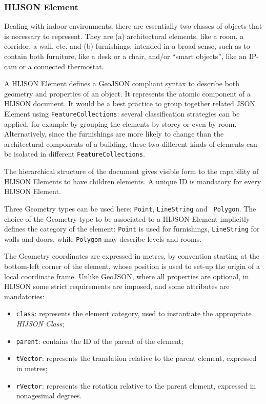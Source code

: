 \subsubsection{HIJSON Element}

Dealing with indoor environments, there are essentially two classes of objects
that is necessary to represent. They are (a) architectural elements, like a
room, a corridor, a wall, etc. and (b) furnishings, intended in a broad sense,
such as to contain both furniture, like a desk or a chair, and/or ``smart objects'',
like an IP-cam or a connected thermostat.

A HIJSON Element defines a GeoJSON compliant syntax to describe both geometry and properties of
an object. It represents the atomic component of a HIJSON document. 
It would be a best practice to group
together related JSON Element using {\tt FeatureCollections}: several classification strategies
can be applied, for example by grouping the elements by storey or even by room.
Alternatively, since the furnishings are more likely to change than the
architectural components of a building, these two different kinds of elements
can be isolated in different {\tt FeatureCollections}.

The hierarchical structure of the document gives visible form to the capability of HIJSON Elements to have children elements. A unique ID is mandatory for every HIJSON Element. 

Three Geometry types can be used here: {\tt Point}, {\tt LineString}  and {\tt
Polygon}. The choice of the Geometry type to be associated to a HIJSON Element
implicitly defines the category of the element: {\tt Point} is used for
furnishings, {\tt LineString} for walls and doors, while {\tt Polygon} may
describe levels and rooms.

The Geometry coordinates are expressed in metres, by convention starting at
the bottom-left corner of the element, whose position is used to set-up the
origin of a local coordinate frame. Unlike GeoJSON, where all properties are
optional, in HIJSON some strict requirements are imposed, and some attributes
are mandatories:

\begin{itemize}
\itemsep1pt\parskip0pt
\item
 {\tt class}: represents the element category, used to instantiate
 the appropriate \emph{HIJSON Class};
\item
 {\tt parent}: contains the ID of the parent of the element;
\item
 {\tt tVector}: represents the translation relative to 
 the parent element, expressed in metres;
\item
 {\tt rVector}: represents the rotation relative to 
 the parent element, expressed in nonagesimal degrees.
\end{itemize}

